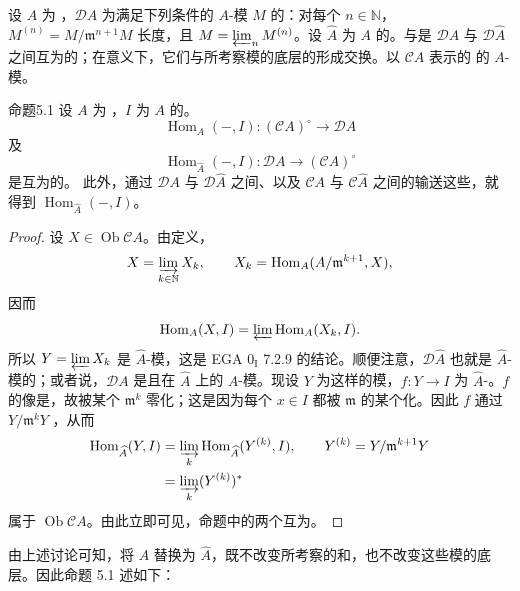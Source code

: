 设 $A$ 为 ，$\mathcal D A$ 为满足下列条件的 $A$-模 $M$ 的：对每个 $n\in\mathbb N$，$M^{(n)}=M/\mathfrak m^{n+1}M$ 长度，且 $M=\varprojlim_n M^{(n)}$。设 $\widehat A$ 为 $A$ 的。与是 $\mathcal D A$ 与 $\mathcal D\widehat A$ 之间互为的；在意义下，它们与所考察模的底层的形成交换。以 $\mathcal C A$ 表示的 的 $A$-模。
\begin{SGAresult}{命题}{5.1}
设 $A$ 为 ，$I$ 为 $A$ 的。
\[\operatorname{Hom}_A(-,I):(\mathcal C A)^{\circ}\longrightarrow\mathcal D A\]
及
\[\operatorname{Hom}_{\widehat A}(-,I):\mathcal D A\longrightarrow(\mathcal C A)^{\circ}\]
是互为的。
此外，通过 $\mathcal D A$ 与 $\mathcal D\widehat A$ 之间、以及 $\mathcal C A$ 与 $\mathcal C\widehat A$ 之间的输送这些，就得到 $\operatorname{Hom}_{\widehat A}(-,I)$。
\end{SGAresult}
\begin{proof}
设 $X\in\operatorname{Ob}\mathcal C A$。由定义，
\[X=\varinjlim_{k\in\mathbb N}X_k,\qquad X_k=\operatorname{Hom}_A(A/\mathfrak m^{k+1},X),\]
因而
\[\operatorname{Hom}_A(X,I)=\varprojlim\operatorname{Hom}_A(X_k,I).\]
所以 $Y=\varprojlim X_k$ 是 $\widehat A$-模，这是 EGA $0_{\mathrm I}$ 7.2.9 的结论。顺便注意，$\mathcal D\widehat A$ 也就是 $\widehat A$-模的；或者说，$\mathcal D A$ 是且在 $\widehat A$ 上的 $A$-模。现设 $Y$ 为这样的模，$f:Y\to I$ 为 $\widehat A$-。$f$ 的像是，故被某个 $\mathfrak m^k$ 零化；这是因为每个 $x\in I$ 都被 $\mathfrak m$ 的某个化。因此 $f$ 通过 $Y/\mathfrak m^kY$ ，从而
\[\begin{aligned}
\operatorname{Hom}_{\widehat A}(Y,I)&=\varinjlim_k\operatorname{Hom}_{\widehat A}(Y^{(k)},I),\qquad Y^{(k)}=Y/\mathfrak m^{k+1}Y\\
&=\varinjlim_k(Y^{(k)})^*
\end{aligned}\]
属于 $\operatorname{Ob}\mathcal C A$。由此立即可见，命题中的两个互为。
\end{proof}
由上述讨论可知，将 $A$ 替换为 $\widehat A$，既不改变所考察的和，也不改变这些模的底层。因此命题 5.1 述如下：

